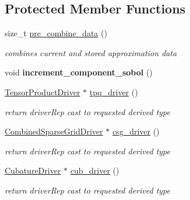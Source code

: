 \subsection*{Protected Member Functions}
\begin{DoxyCompactItemize}
\item 
size\+\_\+t \hyperlink{classPecos_1_1SharedProjectOrthogPolyApproxData_a9eb4d06b29a49d454be12741309d8a2b}{pre\+\_\+combine\+\_\+data} ()\label{classPecos_1_1SharedProjectOrthogPolyApproxData_a9eb4d06b29a49d454be12741309d8a2b}

\begin{DoxyCompactList}\small\item\em combines current and stored approximation data \end{DoxyCompactList}\item 
void {\bfseries increment\+\_\+component\+\_\+sobol} ()\label{classPecos_1_1SharedProjectOrthogPolyApproxData_ae66f3349bfdbb48a266dd09760f4f023}

\item 
\hyperlink{classPecos_1_1TensorProductDriver}{Tensor\+Product\+Driver} $\ast$ \hyperlink{classPecos_1_1SharedProjectOrthogPolyApproxData_aecf09ae2f3421803794fffa2ddc779a9}{tpq\+\_\+driver} ()\label{classPecos_1_1SharedProjectOrthogPolyApproxData_aecf09ae2f3421803794fffa2ddc779a9}

\begin{DoxyCompactList}\small\item\em return driver\+Rep cast to requested derived type \end{DoxyCompactList}\item 
\hyperlink{classPecos_1_1CombinedSparseGridDriver}{Combined\+Sparse\+Grid\+Driver} $\ast$ \hyperlink{classPecos_1_1SharedProjectOrthogPolyApproxData_a318d97dbe0d8d4293d996be0fd6df99a}{csg\+\_\+driver} ()\label{classPecos_1_1SharedProjectOrthogPolyApproxData_a318d97dbe0d8d4293d996be0fd6df99a}

\begin{DoxyCompactList}\small\item\em return driver\+Rep cast to requested derived type \end{DoxyCompactList}\item 
\hyperlink{classPecos_1_1CubatureDriver}{Cubature\+Driver} $\ast$ \hyperlink{classPecos_1_1SharedProjectOrthogPolyApproxData_a069e706d734fa4ec33cf6ee4f3d16ea7}{cub\+\_\+driver} ()\label{classPecos_1_1SharedProjectOrthogPolyApproxData_a069e706d734fa4ec33cf6ee4f3d16ea7}

\begin{DoxyCompactList}\small\item\em return driver\+Rep cast to requested derived type \end{DoxyCompactList}\end{DoxyCompactItemize}
